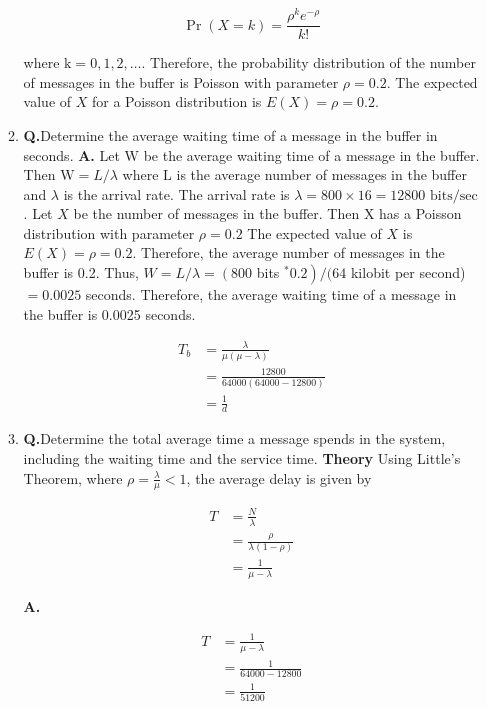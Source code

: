 \documentclass[main.tex]{subfiles}
\begin{document}
\begin{enumerate}
\begin{enumerate}
        $$
        \operatorname{Pr}(X=k)=\frac{\rho^k e^{-\rho}}{k!}
        $$
        
        where $\mathrm{k}=0,1,2, \ldots$. Therefore, the probability distribution of the number of messages in the buffer is Poisson with parameter $\rho=0.2$. The expected value of $X$ for a Poisson distribution is $E(X)=\rho=0.2$.
        
        \item \textbf{Q.}Determine the average waiting time of a message in the buffer in seconds. \textbf{A.} Let $\mathrm{W}$ be the average waiting time of a message in the buffer. Then $\mathrm{W }= L/\lambda$ where $\mathrm{L}$ is the average number of messages in the buffer and $\lambda$ is the arrival rate. The arrival rate is $\lambda =800 \times 16 = 12800$ $\mathrm{bits}/\mathrm{sec}$. Let $X$ be the number of messages in the buffer. Then $\mathrm{X}$ has a Poisson distribution with parameter $\rho=0.2$ The expected value of $X$ is $E(X)=\rho=0.2$. Therefore, the average number of messages in the buffer is 0.2. Thus, $W = L/\lambda=\left(800\right.$ bits $\left.{ }^* 0.2\right) /(64$ kilobit per second) $=0.0025$ seconds. Therefore, the average waiting time of a message in the buffer is 0.0025 seconds.
        
        $$
        \begin{aligned}
        T_b & =\frac{\lambda}{\mu(\mu-\lambda)} \\
        & =\frac{12800}{64000(64000-12800)} \\
        & =\frac{1}{d}
        \end{aligned}
        $$  
        
        \item \textbf{Q.}Determine the total average time a message spends in the system, including the waiting time and the service time. \textbf{Theory} Using Little's Theorem, where $\rho=\frac{\lambda}{\mu}<1$, the average delay is given by
        
        $$
        \begin{aligned}
        T&=\frac{N}{\lambda}\\
        &=\frac{\rho}{\lambda(1-\rho)}\\
        &=\frac{1}{\mu-\lambda}
        \end{aligned}
        $$   
        
        \textbf {A.} 
        
        $$
        \begin{aligned}
        T &= \frac{1}{\mu-\lambda} \\
        &= \frac{1}{64000-12800} \\
        &= \frac{1}{51200}
        \end{aligned}
        $$
        

\end{enumerate}
\end{enumerate}
\end{document}
